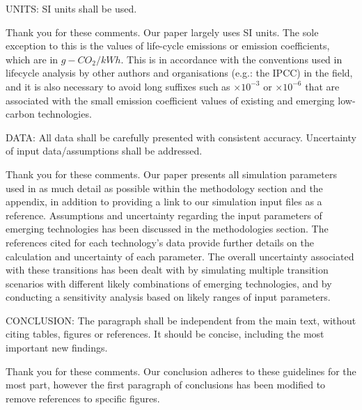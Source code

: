 \documentclass[answers,11pt]{exam}
\begin{document}
\begin{questions}
UNITS: SI units shall be used.

 \begin{solution}
                Thank you for these comments. Our paper largely uses SI units. The sole exception to this is the values of life-cycle emissions or emission coefficients, which are in $g-CO_2/kWh$. This is in accordance with the conventions used in lifecycle analysis by other authors and organisations (e.g.: the IPCC) in the field, and it is also necessary to avoid long suffixes such as $\times 10^{-3}$ or $\times 10^{-6}$ that are associated with the small emission coefficient values of existing and emerging low-carbon technologies.
                
        \end{solution}

     
  \question  

DATA: All data shall be carefully presented with consistent accuracy. Uncertainty of input data/assumptions shall be addressed.

 \begin{solution}
                Thank you for these comments. Our paper presents all simulation parameters used in as much detail as possible within the methodology section and the appendix, in addition to providing a link to our simulation input files as a reference. Assumptions and uncertainty regarding the input parameters of emerging technologies has been discussed in the methodologies section. The references cited for each technology's data provide further details on the calculation and uncertainty of each parameter. The overall uncertainty associated with these transitions has been dealt with by simulating multiple transition scenarios with different likely combinations of emerging technologies, and by conducting a sensitivity analysis based on likely ranges of input parameters.
                
        \end{solution}

      \question  

CONCLUSION: The paragraph shall be independent from the main text, without citing tables, figures or references. It should be concise, including the most important new findings.

 \begin{solution}
                Thank you for these comments. Our conclusion adheres to these guidelines for the most part, however the first paragraph of conclusions has been modified to remove references to specific figures.
                

\end{solution}
\end{questions}
\end{document}
